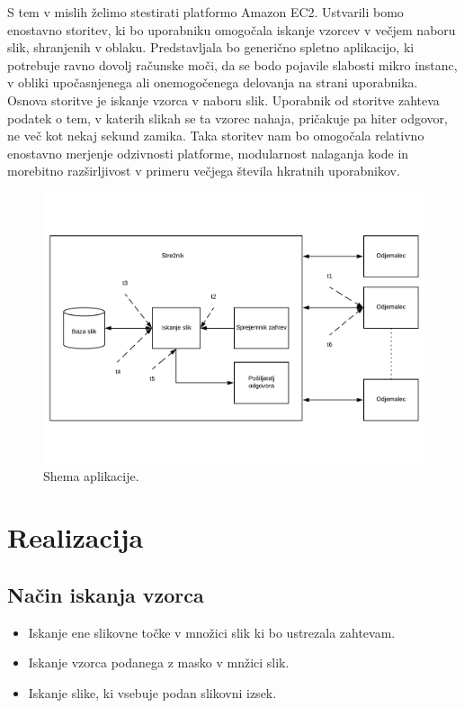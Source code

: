 S tem v mislih želimo stestirati platformo Amazon EC2.
Ustvarili bomo enostavno storitev, ki bo uporabniku omogočala iskanje vzorcev v večjem naboru slik, shranjenih v oblaku.
Predstavljala bo generično spletno aplikacijo, ki potrebuje ravno dovolj računske moči, da se bodo pojavile slabosti mikro instanc, v obliki upočasnjenega ali onemogočenega delovanja na strani uporabnika.
Osnova storitve je iskanje vzorca v naboru slik.
Uporabnik od storitve zahteva podatek o tem, v katerih slikah se ta vzorec nahaja, pričakuje pa hiter odgovor, ne več kot nekaj sekund zamika.
Taka storitev nam bo omogočala relativno enostavno merjenje odzivnosti platforme, modularnost nalaganja kode in morebitno razširljivost v primeru večjega števila hkratnih uporabnikov.

	
\begin{figure}[H]
\centering
\includegraphics[scale=0.4]{Img/1_shema.pdf}
\caption{Shema aplikacije.}
\label{fig:1_osnovnaShema}
\end{figure}

\section{Realizacija}

\subsection{Način iskanja vzorca}
\begin{itemize}
\item Iskanje ene slikovne točke v množici slik ki bo ustrezala zahtevam.
\item Iskanje vzorca podanega z masko v mnžici slik.
\item Iskanje slike, ki vsebuje podan slikovni izsek.
\end{itemize}


